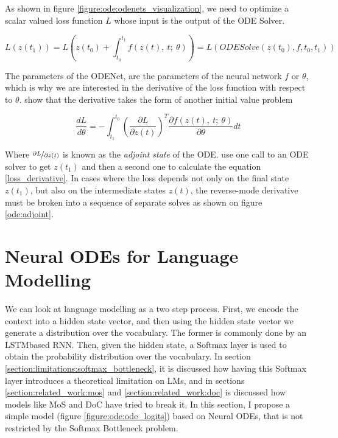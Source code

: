 As shown in figure \ref{figure:ode:odenets_visualization}, we need to optimize a scalar valued loss function $ L $ whose input is the output of the ODE Solver.

\begin{equation}
    L(z(t_1)) = L \left( z(t_0) + \int_{t_0}^{t_1} f(z(t), \ t; \ \theta ) \right) = L(ODESolve(z(t_0), f, t_0, t_1))
\end{equation}

The parameters of the ODENet, are the parameters of the neural network $ f $ or $ \theta $, which is why we are interested in the derivative of the loss function with respect to $ \theta $. \citet{pontryagin2018mathematical} show that the derivative takes the form of another initial value problem

\begin{equation}
    \label{loss_derivative}
    \frac{dL}{d\theta} = - \int_{t_1}^{t_0} \left(\frac{\partial L}{\partial z(t)}\right)^T \frac{\partial f(z(t), \ t; \ \theta)}{\partial \theta}dt
\end{equation}

Where $ \nicefrac{\partial L}{\partial z(t)} $ is known as the \emph{adjoint state} of the ODE. \citet{chen2018neural} use one call to an ODE solver to get $ z(t_1) $ and then a second one to calculate the equation \ref{loss_derivative}. In cases where the loss depends not only on the final state $ z(t_1) $, but also on the intermediate states $ z(t) $, the reverse-mode derivative must be broken into a sequence of separate solves as shown on figure \ref{ode:adjoint}.

\section{Neural ODEs for Language Modelling}
\label{section:ode:ode_lms}

We can look at language modelling as a two step process. First, we encode the context into a hidden state vector, and then using the hidden state vector we generate a distribution over the vocabulary. The former is commonly done by an LSTM\osc{-}based RNN. Then, given the hidden state, a Softmax layer is used to obtain the probability distribution over the vocabulary. In section \ref{section:limitations:softmax_bottleneck}, it is discussed how having this Softmax layer introduces a theoretical limitation on LMs, and in sections \ref{section:related_work:mos} and \ref{section:related_work:doc} is discussed how models like MoS \citep{yang2017breaking} and DoC \citep{takase2018direct} have tried to break it. In this section, I  propose a simple model (figure \ref{figure:ode:ode_logits}) based on Neural ODEs, that is not restricted by the Softmax Bottleneck problem.

